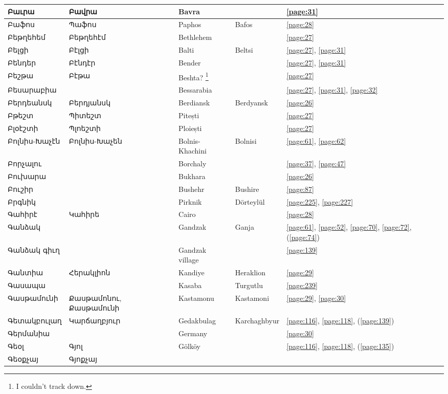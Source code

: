\begin{center}
\begin{longtable}{|p{}|p{3cm}|p{3cm}|p{2cm}|p{3cm}|}
Բաւրա& Բավրա
& {Bavra}& &\ref{page:31}\\ \hline
Բաֆոս&Պաֆոս
& {Paphos}& Bafos&\ref{page:28}\\ \hline
Բեթղեհեմ&Բեթղեհէմ &
Bethlehem& &\ref{page:27}\\ \hline
Բելցի& Բէլցի&
{Balti}& Beltsi&\ref{page:27}, \ref{page:31}\\ \hline
Բենդեր& Բէնդէր&
{Bender}& &\ref{page:27}, \ref{page:31}\\ \hline
Բեշթա& Բէթա& 
{Beshta?} \footnote{I couldn't track down.}& &\ref{page:27}\\ \hline
Բեսարաբիա&  &Bessarabia & &\ref{page:27}, \ref{page:31}, \ref{page:32}\\ \hline
Բերդեանսկ&Բերդյանսկ &
{Berdiansk}&Berdyansk &\ref{page:26}\\ \hline
Բթեշտ&Պիտեշտ 
&{Pitești}  &    &\ref{page:27}\\ \hline
Բլօէշտի& Պլոեշտի
&{Ploiești}& &\ref{page:27}\\ \hline
Բոլնիս-Խաչէն& Բոլնիս-Խաչեն
& Bolnis-Khachini& Bolnisi&\ref{page:61}, \ref{page:62}\\ \hline
Բորչալու& 
&{Borchaly} & &\ref{page:37}, \ref{page:47}\\ \hline
Բուխարա& &
{Bukhara}& &\ref{page:26}\\ \hline
Բուշիր& & 
{Bushehr}&Bushire &\ref{page:87}\\ \hline
Բրգնիկ& &
{Pirknik}& Dörteylül& \ref{page:225}, \ref{page:227}\\ \hline
Գահիրէ& Կահիրե
&Cairo & &\ref{page:28}\\ \hline
Գանձակ& & 
Gandzak & Ganja&\ref{page:61}, \ref{page:52}, \ref{page:70}, \ref{page:72}, (\ref{page:74})\\ \hline
Գանձակ գիւղ& &
Gandzak village& &\ref{page:139}\\ \hline
Գանտիա& Հերակլիոն& 
{Kandiye}&Heraklion  & \ref{page:29}\\ \hline
Գասապա& & 
{Kasaba}& Turgutlu&\ref{page:239}\\ \hline
Գասթամունի& Քասթամոնու, Քասթամունի&
  Kastamonu& Kastamoni& \ref{page:29}, \ref{page:30}\\ \hline
Գետակբուլաղ&Կարճաղբյուր 
& {Gedakbulag}&Karchaghbyur &\ref{page:116}, \ref{page:118}, (\ref{page:139})\\ \hline
Գերմանիա& & 
Germany& &\ref{page:30}\\ \hline
Գեօլ&Գյոլ
&{Gölköy} & &\ref{page:116}, \ref{page:118}, (\ref{page:135})\\ \hline
Գեօքչայ&Գյոքչայ

\end{longtable}
\end{center}
